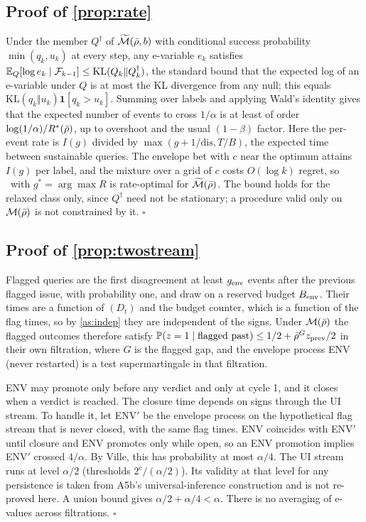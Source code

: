 \subsection{Proof of \cref{prop:rate}}
Under the member $Q^\dagger$ of $\widetilde{\mathcal M}(\bar\rho,b)$ with conditional success probability
$\min(q_k,u_k)$ at every step, any e-variable $e_k$ satisfies
$\mathbb{E}_Q[\log e_k\mid\mathcal{F}_{k-1}]\le\mathrm{KL}(Q_k\Vert Q^\dagger_k)$, the standard bound that the
expected log of an e-variable under $Q$ is at most the KL divergence from any null; this equals
$\mathrm{KL}(q_k\Vert u_k)\mathbf 1[q_k>u_k]$. Summing over labels and applying Wald's identity gives
that the expected number of events to cross $1/\alpha$ is at least of order $\log(1/\alpha)/R^*(\bar\rho)$,
up to overshoot and the usual $(1-\beta)$ factor. Here the per-event rate is $I(g)$ divided by
$\max(g+1/\mathrm{dis},T/B)$, the expected time between sustainable queries. The envelope bet with
$c$ near the optimum attains $I(g)$ per label, and the mixture over a grid of $c$ costs $O(\log k)$
regret, so \NAD\ with $g^*=\arg\max R$ is rate-optimal for $\widetilde{\mathcal M}(\bar\rho)$. The bound
holds for the relaxed class only, since $Q^\dagger$ need not be stationary; a procedure valid only on
$\mathcal M(\bar\rho)$ is not constrained by it. $\square$

\subsection{Proof of \cref{prop:twostream}}
Flagged queries are the first disagreement at least $g_{\rm env}$ events after the previous flagged
issue, with probability one, and draw on a reserved budget $B_{\rm env}$. Their times are a function
of $(D_t)$ and the budget counter, which is a function of the flag times, so by \cref{as:indep} they
are independent of the signs. Under $\mathcal M(\bar\rho)$ the flagged outcomes therefore satisfy
$\mathbb{P}(z=1\mid\text{flagged past})\le1/2+\bar\rho^{G}z_{\rm prev}/2$ in their own filtration, where $G$ is
the flagged gap, and the envelope process ENV (never restarted) is a test supermartingale in that
filtration.

ENV may promote only before any verdict and only at cycle 1, and it closes when a verdict is
reached. The closure time depends on signs through the UI stream. To handle it, let ENV$'$ be the
envelope process on the hypothetical flag stream that is never closed, with the same flag times. ENV
coincides with ENV$'$ until closure and ENV promotes only while open, so an ENV promotion implies
ENV$'$ crossed $4/\alpha$. By Ville, this has probability at most $\alpha/4$. The UI stream runs at
level $\alpha/2$ (thresholds $2^c/(\alpha/2)$). Its validity at that level for any persistence is taken
from A5b's universal-inference construction \citep{wasserman2020universal} and is not re-proved here.
A union bound gives $\alpha/2+\alpha/4<\alpha$. There is no averaging of e-values across filtrations.
$\square$

